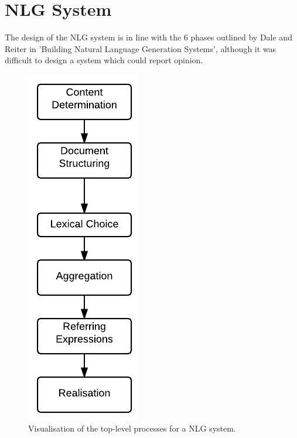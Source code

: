 \section{NLG System}
The design of the NLG system is in line with the 6 phases outlined by Dale and Reiter in 'Building Natural Language Generation Systems', although it was difficult to design a system which could report opinion.
\begin{figure}
\centering
\includegraphics[width=0.7\linewidth]{figures/diagrams_etc/nlg_toplevel}
\caption{Visualisation of the top-level processes for a NLG system.}
\label{fig:nlgtoplevel}
\end{figure}

